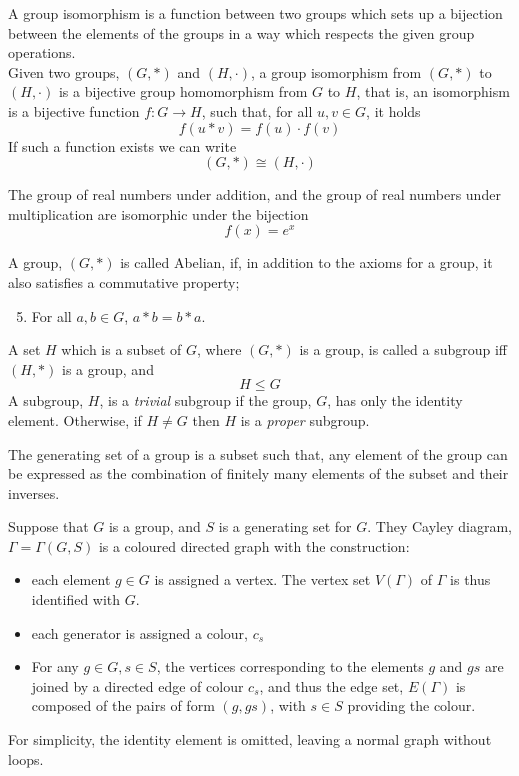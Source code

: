 \documentclass[]{dwnotes}
\begin{document}
\begin{definition}[Isomophism]
  A group isomorphism is a function between two groups which sets up a
  bijection between the elements of the groups in a way which respects
  the given group operations.\\
  Given two groups, $(G,*)$ and $(H, \cdot)$, a group isomorphism from
  $(G,*)$ to $(H,\cdot)$ is a bijective group homomorphism from $G$ to
  $H$, that is, an isomorphism is a bijective function $f : G \to H$,
  such that, for all $u,v \in G$, it holds \[ f(u*v) = f(u) \cdot
  f(v) \] If such a function exists we can write
  \[(G,*) \cong (H,\cdot) \]
\end{definition}
\begin{example}
  The group of real numbers under addition, and the group of real
  numbers under multiplication are isomorphic under the bijection \[
  f(x) = e^x \]
\end{example}
\begin{definition}
  A group, $(G,*)$ is called Abelian, if, in addition to the axioms
  for a group, it also satisfies a commutative property;
  \begin{enumerate}
  \setcounter{enumi}{4}
\item For all $a,b \in G$, $a*b = b*a$.
  \end{enumerate}
\end{definition}
\begin{definition}[Subgroup]
  A set $H$ which is a subset of $G$, where $(G,*)$ is a group, is
  called a subgroup iff $(H,*)$ is a group, and \[ H \le G \] A
  subgroup, $H$, is a \emph{trivial} subgroup if the group, $G$, has
  only the identity element. Otherwise, if $H \neq G$ then $H$ is a
  \emph{proper} subgroup.
\end{definition}
\begin{definition}
  The generating set of a group is a subset such that, any element of
  the group can be expressed as the combination of finitely many
  elements of the subset and their inverses.
\end{definition}
\begin{definition}
  Suppose that $G$ is a group, and $S$ is a generating set for
  $G$. They Cayley diagram, $\Gamma = \Gamma(G,S)$ is a coloured
  directed graph with the construction:
  \begin{itemize}
  \item each element $g\in G$ is assigned a vertex. The vertex set
    $V(\Gamma)$ of $\Gamma$ is thus identified with $G$.
  \item  each generator is assigned a colour, $c_s$
  \item For any $g\in G, s \in S$, the vertices corresponding to the elements $g$ and $gs$ are joined by a directed edge of colour $c_s$, and thus the edge set, $E(\Gamma)$ is composed of the pairs of form $(g,gs)$, with $s\in S$ providing the colour.
  \end{itemize}
For simplicity, the identity element is omitted, leaving a normal graph without loops.
\end{definition}
\end{document}
